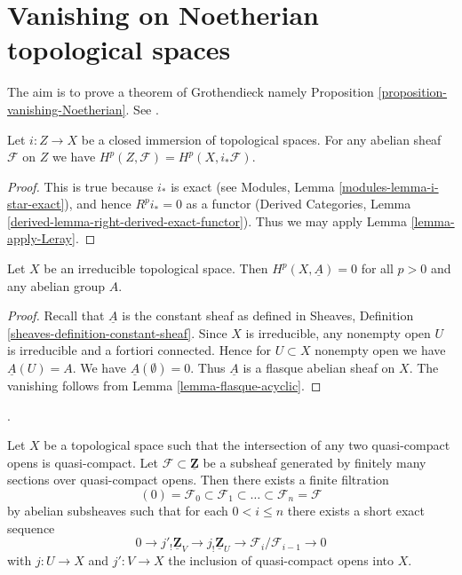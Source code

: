 \section{Vanishing on Noetherian topological spaces}
\label{section-vanishing-Noetherian}

\noindent
The aim is to prove a theorem of Grothendieck namely
Proposition \ref{proposition-vanishing-Noetherian}. See \cite{Tohoku}.

\begin{lemma}
\label{lemma-cohomology-and-closed-immersions}
\begin{reference}
\cite[Chapter I, \S 3, no. 26, Proposition 8, p. 219]{FAC}
\cite[Chapter II, \S 2, no. 39, p. 232]{FAC}
\end{reference}
Let $i : Z \to X$ be a closed immersion of topological spaces.
For any abelian sheaf $\mathcal{F}$ on $Z$ we have
$H^p(Z, \mathcal{F}) = H^p(X, i_*\mathcal{F})$.
\end{lemma}

\begin{proof}
This is true because $i_*$ is exact (see
Modules, Lemma \ref{modules-lemma-i-star-exact}),
and hence $R^pi_* = 0$ as a functor
(Derived Categories, Lemma \ref{derived-lemma-right-derived-exact-functor}).
Thus we may apply Lemma \ref{lemma-apply-Leray}.
\end{proof}

\begin{lemma}
\label{lemma-irreducible-constant-cohomology-zero}
Let $X$ be an irreducible topological space.
Then $H^p(X, \underline{A}) = 0$ for all $p > 0$
and any abelian group $A$.
\end{lemma}

\begin{proof}
Recall that $\underline{A}$ is the constant sheaf as defined
in Sheaves, Definition \ref{sheaves-definition-constant-sheaf}.
Since $X$ is irreducible, any nonempty open $U$ is
irreducible and a fortiori connected. Hence for $U \subset X$
nonempty open we have $\underline{A}(U) = A$.
We have $\underline{A}(\emptyset) = 0$. Thus $\underline{A}$
is a flasque abelian sheaf on $X$. The vanishing follows
from Lemma \ref{lemma-flasque-acyclic}.
\end{proof}

\begin{lemma}
\label{lemma-subsheaf-of-constant-sheaf}
\begin{reference}
\cite[Page 168]{Tohoku}.
\end{reference}
Let $X$ be a topological space such that the intersection of any
two quasi-compact opens is quasi-compact. Let
$\mathcal{F} \subset \underline{\mathbf{Z}}$
be a subsheaf generated by finitely many sections over quasi-compact opens.
Then there exists a finite filtration
$$
(0) = \mathcal{F}_0 \subset \mathcal{F}_1 \subset \ldots \subset
\mathcal{F}_n = \mathcal{F}
$$
by abelian subsheaves such that for each $0 < i \leq n$
there exists a short exact sequence
$$
0 \to j'_!\underline{\mathbf{Z}}_V \to j_!\underline{\mathbf{Z}}_U \to
\mathcal{F}_i/\mathcal{F}_{i - 1} \to 0
$$
with $j : U \to X$ and $j' : V \to X$ the inclusion of quasi-compact opens
into $X$.
\end{lemma}

